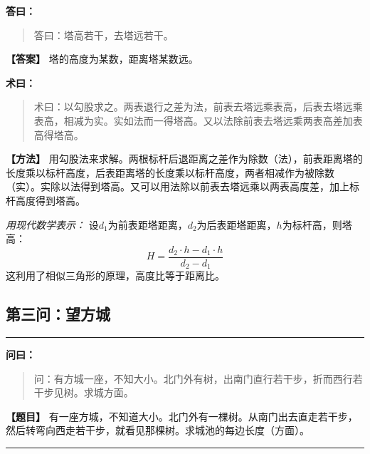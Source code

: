\documentclass[11pt,a4paper]{article}
\newenvironment{mathproblem}[1][]{%
  \medskip\noindent\rule{\textwidth}{0.4pt}%
  \par\noindent{\Large\bfseries\color{sectioncolor}#1}\par\nopagebreak%
  \smallskip%
}{%
  \par\noindent\rule{\textwidth}{0.4pt}\medskip%
}
\newcommand{\wenlabel}{\textbf{\color{origcolor}问曰：}}
\newcommand{\dalabel}{\textbf{\color{origcolor}答曰：}}
\newcommand{\shulabel}{\textbf{\color{origcolor}术曰：}}
\newcommand{\modwenlabel}{\textbf{\color{modcolor}【题目】}}
\newcommand{\moddalabel}{\textbf{\color{modcolor}【答案】}}
\newcommand{\modshulabel}{\textbf{\color{modcolor}【方法】}}
\begin{document}
\begin{originaltext}
\dalabel
\begin{quote}
\textcolor{origcolor}{%
答曰：塔高若干，去塔远若干。
}
\end{quote}
\end{originaltext}

\begin{moderntext}
\moddalabel
塔的高度为某数，距离塔某数远。
\end{moderntext}

\begin{originaltext}
\shulabel
\begin{quote}
\textcolor{origcolor}{%
术曰：以勾股求之。两表退行之差为法，前表去塔远乘表高，后表去塔远乘表高，相减为实。实如法而一得塔高。又以法除前表去塔远乘两表高差加表高得塔高。
}
\end{quote}
\end{originaltext}

\begin{moderntext}
\modshulabel
用勾股法来求解。两根标杆后退距离之差作为除数（法），前表距离塔的长度乘以标杆高度，后表距离塔的长度乘以标杆高度，两者相减作为被除数（实）。实除以法得到塔高。又可以用法除以前表去塔远乘以两表高度差，加上标杆高度得到塔高。

\textit{用现代数学表示：} 设$d_1$为前表距塔距离，$d_2$为后表距塔距离，$h$为标杆高，则塔高：
\[
H = \frac{d_2 \cdot h - d_1 \cdot h}{d_2 - d_1}
\]
这利用了相似三角形的原理，高度比等于距离比。
\end{moderntext}

\subsection*{第三问：望方城}

\begin{mathproblem}[\textbf{第三问：望方城}]

\begin{originaltext}
\wenlabel
\begin{quote}
\textcolor{origcolor}{%
问：有方城一座，不知大小。北门外有树，出南门直行若干步，折而西行若干步见树。求城方面。
}
\end{quote}
\end{originaltext}

\begin{moderntext}
\modwenlabel
有一座方城，不知道大小。北门外有一棵树。从南门出去直走若干步，然后转弯向西走若干步，就看见那棵树。求城池的每边长度（方面）。
\end{moderntext}

\end{mathproblem}
\end{document}
